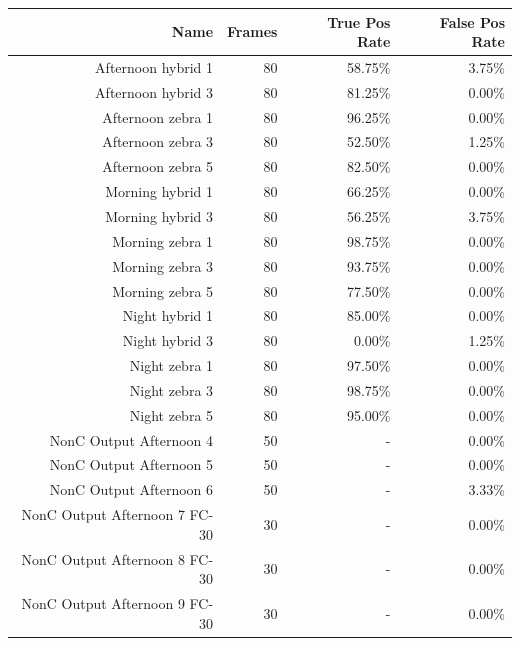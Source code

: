 \documentclass[12pt]{ucthesis}
\begin{document}
    \begin{longtable}{|r|r|r|r|}
    
    \hline
    Name  & Frames & True Pos Rate & False Pos Rate \bigstrut\\
    \hline
    Afternoon hybrid 1 & 80    & 58.75\% & 3.75\% \bigstrut\\
    \hline
    Afternoon hybrid 3 & 80    & 81.25\% & 0.00\% \bigstrut\\
    \hline
    Afternoon zebra 1 & 80    & 96.25\% & 0.00\% \bigstrut\\
    \hline
    Afternoon zebra 3 & 80    & 52.50\% & 1.25\% \bigstrut\\
    \hline
    Afternoon zebra 5 & 80    & 82.50\% & 0.00\% \bigstrut\\
    \hline
    Morning hybrid 1 & 80    & 66.25\% & 0.00\% \bigstrut\\
    \hline
    Morning hybrid 3 & 80    & 56.25\% & 3.75\% \bigstrut\\
    \hline
    Morning zebra 1 & 80    & 98.75\% & 0.00\% \bigstrut\\
    \hline
    Morning zebra 3 & 80    & 93.75\% & 0.00\% \bigstrut\\
    \hline
    Morning zebra 5 & 80    & 77.50\% & 0.00\% \bigstrut\\
    \hline
    Night hybrid 1 & 80    & 85.00\% & 0.00\% \bigstrut\\
    \hline
    Night hybrid 3 & 80    & 0.00\% & 1.25\% \bigstrut\\
    \hline
    Night zebra 1 & 80    & 97.50\% & 0.00\% \bigstrut\\
    \hline
    Night zebra 3 & 80    & 98.75\% & 0.00\% \bigstrut\\
    \hline
    Night zebra 5 & 80    & 95.00\% & 0.00\% \bigstrut\\
    \hline
    NonC Output Afternoon 4 & 50    & -     & 0.00\% \bigstrut\\
    \hline
    NonC Output Afternoon 5 & 50    & -     & 0.00\% \bigstrut\\
    \hline
    NonC Output Afternoon 6 & 50    & -     & 3.33\% \bigstrut\\
    \hline
    NonC Output Afternoon 7 FC-30 & 30    & -     & 0.00\% \bigstrut\\
    \hline
    NonC Output Afternoon 8 FC-30 & 30    & -     & 0.00\% \bigstrut\\
    \hline
    NonC Output Afternoon 9 FC-30 & 30    & -     & 0.00\% \bigstrut\\

\end{longtable}
\end{document}
